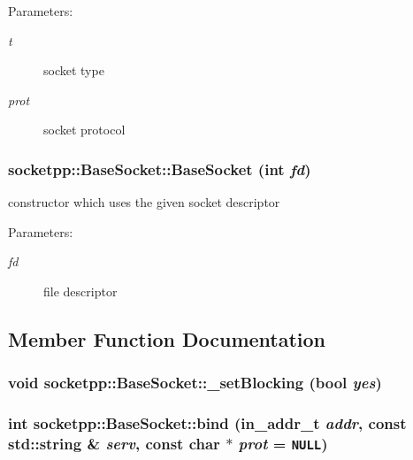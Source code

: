 \begin{Desc}
\item[Parameters:]
\begin{description}
\item[{\em t}]socket type \item[{\em prot}]socket protocol \end{description}
\end{Desc}
\hypertarget{classsocketpp_1_1BaseSocket_f7e18d6700868abb2b476e797506eafb}{
\subsubsection[{BaseSocket}]{\setlength{\rightskip}{0pt plus 5cm}socketpp::BaseSocket::BaseSocket (int {\em fd})}}
\label{classsocketpp_1_1BaseSocket_f7e18d6700868abb2b476e797506eafb}


constructor which uses the given socket descriptor 

\begin{Desc}
\item[Parameters:]
\begin{description}
\item[{\em fd}]file descriptor \end{description}
\end{Desc}


\subsection{Member Function Documentation}
\hypertarget{classsocketpp_1_1BaseSocket_4d49273453cf67218a89065bba9088c4}{
\subsubsection[{\_\-setBlocking}]{\setlength{\rightskip}{0pt plus 5cm}void socketpp::BaseSocket::\_\-setBlocking (bool {\em yes})}}
\label{classsocketpp_1_1BaseSocket_4d49273453cf67218a89065bba9088c4}


\hypertarget{classsocketpp_1_1BaseSocket_aab800bcb5ee48cd4410ae2b9ed83e23}{
\subsubsection[{bind}]{\setlength{\rightskip}{0pt plus 5cm}int socketpp::BaseSocket::bind (in\_\-addr\_\-t {\em addr}, \/  const std::string \& {\em serv}, \/  const char $\ast$ {\em prot} = {\tt NULL})}}
\label{classsocketpp_1_1BaseSocket_aab800bcb5ee48cd4410ae2b9ed83e23}


